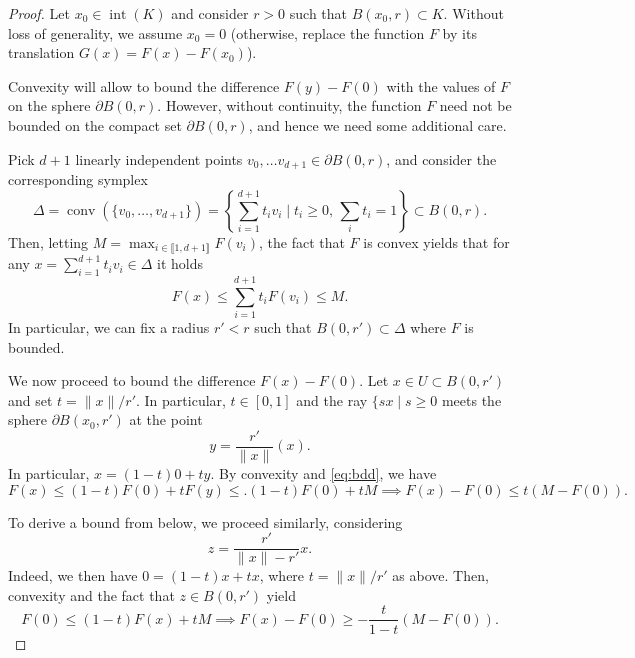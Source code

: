 \documentclass{report}
\begin{document}
	\begin{proof}
		Let $x_0\in \operatorname{int}(K)$ and consider $r>0$ such that $B(x_0,r)\subset K$. Without loss of generality, we assume $x_0=0$ (otherwise, replace the function $F$ by its translation $G(x) = F(x)-F(x_0)$).

		Convexity will allow to bound the difference $F(y)-F(0)$ with the values of $F$ on the sphere $\partial B(0,r)$.
		However, without continuity, the function $F$ need not be bounded on the compact set $\partial B(0,r)$, and hence we need some additional care.

		Pick $d+1$ linearly independent points $v_0,\ldots v_{d+1}\in \partial B(0,r)$, and consider the corresponding symplex
		\begin{equation}
			\Delta = \operatorname{conv}\left(\{v_0,\ldots,v_{d+1}\}  \right) 
			= \left\{  \sum_{i=1}^{d+1} t_i v_i \mid t_i\ge 0,\, \sum_i t_i=1 \right\}\subset B(0,r).
		\end{equation}
		Then, letting $M = \max_{i\in \llbracket1,d+1 \rrbracket} F(v_i)$, the fact that $F$ is convex yields that for any $x=\sum_{i=1}^{d+1} t_i v_i\in \Delta$ it holds
		\begin{equation}
			\label{eq:bdd}
			F(x) \le \sum_{i=1}^{d+1} t_i F(v_i) \le M.
		\end{equation}
		In particular, we can fix a radius $r'<r$ such that  $B(0,r')\subset \Delta$ where $F$ is bounded.

		We now proceed to bound the difference $F(x)-F(0)$.
		Let $x\in U\subset B(0,r')$ and set $t = \|x\|/r'$. In particular, $t\in [0,1]$ and the ray $\{sx\mid s\ge 0$ meets the sphere $\partial B(x_0,r')$ at the point 
		\begin{equation}
			y= \frac{r'}{\|x\|}(x).
		\end{equation}
		In particular, $x=(1-t)0 + ty$. By convexity and \eqref{eq:bdd}, we have 
		\begin{equation}
			\label{eq:upper}
			F(x) \le (1-t) F(0) + t F(y) \le. (1-t)F(0)+ t M 
			\implies 
			F(x)-F(0) \le t(M-F(0)).
		\end{equation}

		To derive a bound from below, we proceed similarly, considering 
		\begin{equation}
			z = \frac{r'}{\|x\|-r'}x.
		\end{equation}
		Indeed, we then have $0 = (1-t)x + t x$, where $t=\|x\|/r'$ as above. Then, convexity and the fact that $z\in B(0,r')$ yield
		\begin{equation}
			\label{eq:lower}
			F(0)\le (1-t)F(x) +tM \implies F(x)-F(0)\ge -\frac{t}{1-t}(M-F(0)).
		\end{equation}


\end{proof}
\end{document}
